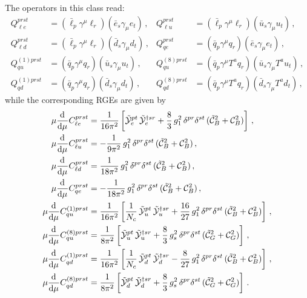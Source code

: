 The operators in this class read:
\begin{align}
Q_{\ell e}^{prst} &= (\bar{\ell}_p \gamma^\mu \ell_r)(\bar{e}_s \gamma_\mu e_t)\,, & Q_{\ell u}^{prst} &= (\bar{\ell}_p \gamma^\mu \ell_r)(\bar{u}_s \gamma_\mu u_t)\,, \\
Q_{\ell d}^{prst}&= (\bar{\ell}_p \gamma^\mu \ell_r)(\bar{d}_s \gamma_\mu d_t)\,, & Q_{qe}^{prst} &= (\bar{q}_p \gamma^\mu q_r)(\bar{e}_s \gamma_\mu e_t)\,,\\
Q_{qu}^{(1)prst} &= (\bar{q}_p \gamma^\mu q_r)(\bar{u}_s \gamma_\mu u_t)\,, & Q_{qu}^{(8)prst} &= (\bar{q}_p \gamma^\mu T^a q_r)(\bar{u}_s \gamma_\mu T^au_t)\,,\\
Q_{qd}^{(1)prst} &= (\bar{q}_p \gamma^\mu q_r)(\bar{d}_s \gamma_\mu d_t)\,, & Q_{qd}^{(8)prst} &= (\bar{q}_p \gamma^\mu T^a q_r)(\bar{d}_s \gamma_\mu T^a d_t)\,,
\end{align}
while the corresponding RGEs are given by
\begin{align}
\mu \dv[]{}{\mu}{C}_{\ell e}^{prst} &= \frac{1}{16\pi^2}\left[\tilde{\mathcal{Y}}_e^{pt}\,\tilde{\mathcal{Y}}_e^{\dagger sr} + \frac{8}{3}\,g_1^2\,\delta^{pr}\delta^{st} \,(\tilde{\mathcal{C}}_{B}^2 + \mathcal{C}_{B}^2)\right] \, ,  
\\
\mu \dv[]{}{\mu}{C}_{\ell u}^{prst} &= -\frac{1}{9\pi^2}\,g_1^2 \,\delta^{pr}\delta^{st}\, (\tilde{\mathcal{C}}_{B}^2 + \mathcal{C}_{B}^2) \, ,  
\\
\mu \dv[]{}{\mu}{C}_{\ell d}^{prst} &= \frac{1}{18\pi^2}\,g_1^2 \,\delta^{pr}\delta^{st}\, (\tilde{\mathcal{C}}_{B}^2 + \mathcal{C}_{B}^2) \, ,  
\\
\mu \dv[]{}{\mu}{C}_{qe}^{prst} &= -\frac{1}{18\pi^2}\,g_1^2\,\delta^{pr}\delta^{st} \, (\tilde{\mathcal{C}}_{B}^2 + \mathcal{C}_{B}^2) \, ,  
\\
\mu \dv[]{}{\mu}{C}_{qu}^{(1)prst} &=\frac{1}{16\pi^2}\left[\frac{1}{N_c}\,\tilde{\mathcal{Y}}_u^{pt}\,\tilde{\mathcal{Y}}_u^{\dagger sr} + \frac{16}{27}\,g_1^2\,\delta^{pr}\delta^{st} \,(\tilde{\mathcal{C}}_{B}^2 + \mathcal{C}_{B}^2)\right] \, ,  
\\
\mu \dv[]{}{\mu}{C}_{qu}^{(8)prst} &=\frac{1}{8\pi^2}\left[\tilde{\mathcal{Y}}_u^{pt}\,\tilde{\mathcal{Y}}_u^{\dagger sr} + \frac{8}{3}\,g_s^2\,\delta^{pr}\delta^{st} \,(\tilde{\mathcal{C}}_{G}^2 + \mathcal{C}_{G}^2)\right] \, ,  
\\
\mu \dv[]{}{\mu}{C}_{qd}^{(1)prst} &=\frac{1}{16\pi^2}\left[\frac{1}{N_c}\,\tilde{\mathcal{Y}}_d^{pt}\,\tilde{\mathcal{Y}}_d^{\dagger sr} - \frac{8}{27}\,g_1^2\,\delta^{pr}\delta^{st} \,(\tilde{\mathcal{C}}_{B}^2 + \mathcal{C}_{B}^2)\right] \, ,  
\\
\mu \dv[]{}{\mu}{C}_{qd}^{(8)prst} &=\frac{1}{8\pi^2}\left[\tilde{\mathcal{Y}}_d^{pt}\,\tilde{\mathcal{Y}}_d^{\dagger sr} + \frac{8}{3}\,g_s^2\,\delta^{pr}\delta^{st} \,(\tilde{\mathcal{C}}_{G}^2 + \mathcal{C}_{G}^2)\right] \, .
\end{align}
%

